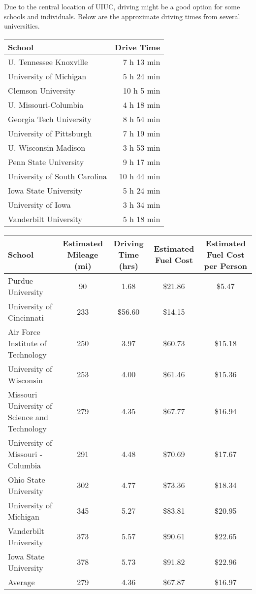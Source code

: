 \begin{center}
Due to the central location of UIUC, driving might be a good option for some schools and individuals. Below are the approximate driving times from several universities. 
\begin{center}
	\begin{tabular}{l r}
	\hline\hline
	\textbf{School}& \textbf{Drive Time}\\
	\hline\hline
	U. Tennessee Knoxville & 7 h 13 min\\
	University of Michigan & 5 h 24 min\\
	Clemson University & 10 h 5 min\\
	U. Missouri-Columbia & 4 h 18 min\\
	Georgia Tech University & 8 h 54 min \\
	University of Pittsburgh & 7 h 19 min\\
	U. Wisconsin-Madison & 3 h 53 min \\
	Penn State University & 9 h 17 min\\
	University of South Carolina& 10 h 44 min\\
	Iowa State University & 5 h 24 min \\
	University of Iowa & 3 h 34 min\\
	Vanderbilt University & 5 h 18 min\\
	\end{tabular}
\end{center}

\begin{center}
   \begin{tabular}{lcccc}
   \hline\hline
   School&Estimated Mileage (mi)&Driving Time (hrs)&Estimated Fuel  Cost&Estimated Fuel Cost per Person\\
   \hline\hline
    Purdue University&90&1.68&\$21.86&\$5.47\\
    University of Cincinnati&233&\$56.60&\$14.15\\
    Air Force Institute of Technology&250&3.97&\$60.73&\$15.18\\
    University of Wisconsin&253&4.00&\$61.46&\$15.36\\
    Missouri University of Science and Technology&279&4.35&\$67.77&\$16.94\\
    University of Missouri - Columbia&291&4.48&\$70.69&\$17.67\\
    Ohio State University&302&4.77&\$73.36&\$18.34\\
    University of Michigan&345&5.27&\$83.81&\$20.95\\
    Vanderbilt University&373&5.57&\$90.61&\$22.65\\
    Iowa State University&378&5.73&\$91.82&\$22.96\\
    \hline
    Average&279&4.36&\$67.87&\$16.97


\end{tabular}
\end{center}
\end{center}
